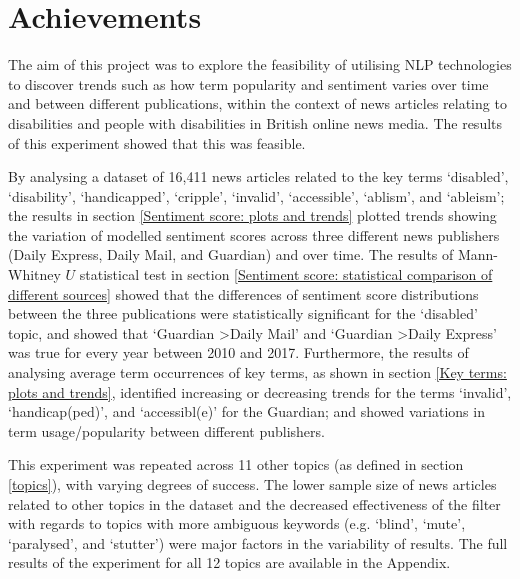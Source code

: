 \documentclass{report}
\begin{document}
\section{Achievements} \label{Achievements}

The aim of this project was to explore the feasibility of utilising NLP technologies to discover trends such as how term popularity and sentiment varies over time and between different publications, within the context of news articles relating to disabilities and people with disabilities in British online news media.
The results of this experiment showed that this was feasible.

By analysing a dataset of 16,411 news articles related to the key terms `disabled', `disability', `handicapped', `cripple', `invalid', `accessible', `ablism', and `ableism'; the results in section \ref{Sentiment score: plots and trends} plotted trends showing the variation of modelled sentiment scores across three different news publishers (Daily Express, Daily Mail, and Guardian) and over time.
The results of Mann-Whitney $U$ statistical test in section \ref{Sentiment score: statistical comparison of different sources} showed that the differences of sentiment score distributions between the three publications were statistically significant for the `disabled' topic, and showed that `Guardian \textgreater\space Daily Mail' and `Guardian \textgreater\space Daily Express' was true for every year between 2010 and 2017.
Furthermore, the results of analysing average term occurrences of key terms, as shown in section \ref{Key terms: plots and trends}, identified increasing or decreasing trends for the terms `invalid', `handicap(ped)', and `accessibl(e)' for the Guardian; and showed variations in term usage/popularity between different publishers.

This experiment was repeated across 11 other topics (as defined in section \ref{topics}), with varying degrees of success. 
The lower sample size of news articles related to other topics in the dataset and the decreased effectiveness of the filter with regards to topics with more ambiguous keywords (e.g. `blind', `mute', `paralysed', and `stutter') were major factors in the variability of results.
The full results of the experiment for all 12 topics are available in the Appendix.
 
\end{document}
